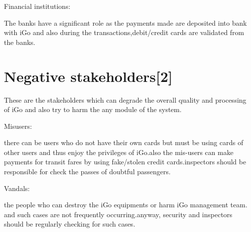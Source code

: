 \documentclass[12pt]{report}
\begin{document}
\vspace{\baselineskip}
Financial institutions:\par

The banks have a significant role as the payments made are deposited into bank with iGo and also during the transactions,debit/credit cards are validated from the banks.\par


\vspace{\baselineskip}
\section{Negative stakeholders[2]}

These are the stakeholders which can degrade the overall quality and processing of iGo and also try to harm the any module of the system.\par


\vspace{\baselineskip}
Misusers:\par

there can be users who do not have their own cards but must be using cards of other users and thus enjoy the privileges of iGo.also the mis-users can make payments for transit fares by using fake/stolen credit cards.inspectors should be responsible for check the passes of doubtful passengers.\par


\vspace{\baselineskip}
Vandals:\par

the people who can destroy the iGo equipments or harm iGo management team. and such cases are not frequently occurring.anyway, security and inspectors should be regularly checking for such cases.\par


\printbibliography
\end{document}
